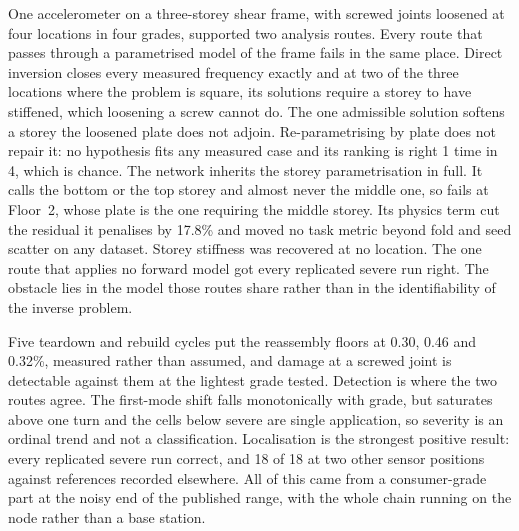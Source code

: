 %
%
%

One accelerometer on a three-storey shear frame, with screwed joints loosened at four
locations in four grades, supported two analysis routes. Every route that passes through a
parametrised model of the frame fails in the same place. Direct inversion closes every
measured frequency exactly and at two of the three locations where the problem is square,
its solutions require a storey to have stiffened, which loosening a screw cannot do. The one
admissible solution softens a storey the loosened plate does not adjoin. Re-parametrising by
plate does not repair it: no hypothesis fits any measured case and its ranking is right 1 time
in 4, which is chance. The network inherits the storey parametrisation in full. It calls the
bottom or the top storey and almost never the middle one, so fails at Floor~2, whose plate is
the one requiring the middle storey. Its physics term cut the residual it penalises by 17.8\%
and moved no task metric beyond fold and seed scatter on any dataset. Storey stiffness was
recovered at no location. The one route that applies no forward model got every replicated
severe run right. The obstacle lies in the model those routes share rather than in the
identifiability of the inverse problem.

Five teardown and rebuild cycles put the reassembly floors at 0.30, 0.46 and 0.32\%,
measured rather than assumed, and damage at a screwed joint is detectable against them at the
lightest grade tested. Detection is where the two routes agree. The first-mode shift falls
monotonically with grade, but saturates above one turn and the cells below severe are single
application, so severity is an ordinal trend and not a classification. Localisation is the
strongest positive result: every replicated severe run correct, and 18 of 18 at two other
sensor positions against references recorded elsewhere. All of this came from a
consumer-grade part at the noisy end of the published range, with the whole chain running on
the node rather than a base station.

